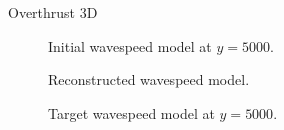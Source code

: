\begin{frame}{Overthrust 3D}
\begin{multicols}{2}
     \columnbreak
     \scriptsize
     \setlength{\modelwidth}{6.0cm}
     \begin{figure}
       \renewcommand{\modelfile}{overthrust_3D_ini}
       
       \vspace{-0.3cm}
       \caption*{\scriptsize{Initial wavespeed model at $y=5000$.}}
       \label{marmousi_blind_c4}
     \end{figure}
     \vspace{-1.2cm}
     \begin{figure}
       \renewcommand{\modelfile}{image/overthrust_3D_last}
       
       \vspace{-0.3cm}
       \caption*{\scriptsize{Reconstructed wavespeed model.}}
       \label{marmousi_blind_c4}
     \end{figure}
     \vspace{-1.2cm}
     \begin{figure}
       \renewcommand{\modelfile}{overthrust_3D_true}
       
       \vspace{-0.3cm}
       \caption*{\scriptsize{Target wavespeed model at $y=5000$.}}
       \label{marmousi_blind_c4}
     \end{figure}

   \end{multicols}

\end{frame}
